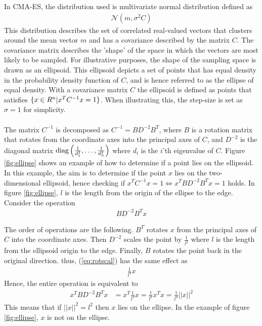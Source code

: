 In CMA-ES, the distribution used is multivariate normal distribution defined
as 
\begin{align}
\mathcal{N} \left( m,  \sigma^2 C \right)
\end{align}
This distribution describes the set of correlated real-valued vectors that
clusters around the mean vector $m$ and has a covariance described by the
matrix $C$. The covariance matrix describes the 'shape' of the space in which 
the vectors are most likely to be sampled. For illustrative purposes,
the shape of the sampling space is drawn as an ellipsoid.
This ellipsoid depicts a set of points that has equal density 
in the probability density function of $C$, and is hence referred to 
as the ellipse of equal density.
With a covariance matrix $C$
the ellipsoid is defined as points that satisfies
$\{x \in R^{n} | x^{T} C^{-1} x = 1\}$.
When illustrating this, the step-size is set as $\sigma = 1$ for simplicity.\\
\\
The matrix $C^{-1}$ is decomposed as $C^{-1} = B D^{-2} B^T$, where $B$ is a rotation 
matrix that rotates from the coordinate axes into the principal axes of $C$, and 
$D^{-2}$ is the diagonal matrix 
$\text{diag} \left( \frac{1}{d_{1}^2},\dots, \frac{1}{d_{n}^2} \right)$
where $d_{i}$ is the $i$'th eigenvalue of $C$. Figure \ref{fig:ellipse} shows an example
of how to determine if a point lies on the ellipsoid. In this example, the aim is to 
determine if the point $x$ lies on the two-dimensional ellipsoid, hence checking if 
$x^{T} C^{-1} x = 1 \Leftrightarrow x^{T} B D^{-2} B^T x = 1 $ holds. In figure 
\ref{fig:ellipse}, $l$ is the length from the origin of the ellipse to the edge.
Consider the operation
\begin{align}
B D^{-2} B^T x \label{eq:rotscal}
\end{align}

The order of operations are the following. 
$B^{T}$ rotates $x$ from the principal axes of $C$
into the coordinate axes. Then $D^{-2}$ scales the point by $\frac{1}{l^2}$ where
$l$ is the length from the ellipsoid origin to the edge. Finally, $B$ rotates the point 
back in the original direction. thus, (\ref{eq:rotscal}) has the same effect as
\begin{align}
\frac{1}{l^2} x
\end{align}
Hence, the entire operation is equivalent to
\begin{align}
x^{T} B D^{-2} B^T x &= x^{T} \frac{1}{l^2} x = \frac{1}{l^2} x^{T} x
= \frac{1}{l^2} ||x||^2
\end{align}
This means that if $||x||^2 = l^2$ then $x$ lies on the ellipse.
In the example of figure \ref{fig:ellipse}, $x$ is not 
on the ellipse.


